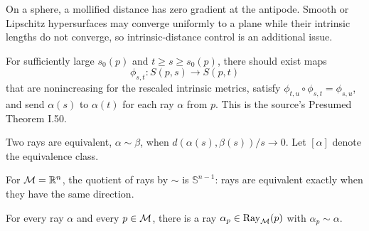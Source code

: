 \begin{example}
\label{ex:chow-iii-i46-i49-mollification}
On a sphere, a mollified distance has zero gradient at the antipode.  Smooth or
Lipschitz hypersurfaces may converge uniformly to a plane while their intrinsic
lengths do not converge, so intrinsic-distance control is an additional issue.
\end{example}

\begin{claim}
\label{clm:chow-iii-i50-large-sphere-maps}
For sufficiently large $s_0(p)$ and $t\ge s\ge s_0(p)$, there should exist maps
\[
\phi_{s,t}:S(p,s)\to S(p,t)
\]
that are nonincreasing for the rescaled intrinsic metrics, satisfy
$\phi_{t,u}\circ\phi_{s,t}=\phi_{s,u}$, and send $\alpha(s)$ to $\alpha(t)$
for each ray $\alpha$ from $p$.  This is the source's Presumed Theorem I.50.
\end{claim}

\begin{definition}
\label{def:chow-iii-i51-ray-equivalence}
Two rays are equivalent, $\alpha\sim\beta$, when
$d(\alpha(s),\beta(s))/s\to0$.  Let $[\alpha]$ denote the equivalence class.
\end{definition}

\begin{example}
\label{ex:chow-iii-i51-euclidean-boundary}
For $\M=\mathbb R^n$, the quotient of rays by $\sim$ is $\mathbb S^{n-1}$: rays are
equivalent exactly when they have the same direction.
\end{example}

\begin{lemma}
\label{lem:chow-iii-i52-rays-at-basepoint}
For every ray $\alpha$ and every $p\in\M$, there is a ray $\alpha_p\in\Ray_{\M}(p)$
with $\alpha_p\sim\alpha$.
\end{lemma}

